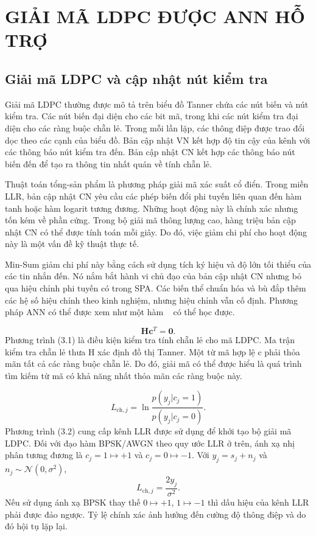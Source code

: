 \chapter[\textbf{GIẢI MÃ LDPC ĐƯỢC ANN HỖ TRỢ}]{GIẢI MÃ LDPC ĐƯỢC ANN HỖ TRỢ}
\section{Giải mã LDPC và cập nhật nút kiểm tra}
Giải mã LDPC thường được mô tả trên biểu đồ Tanner chứa các nút biến và nút kiểm tra. Các nút biến đại diện cho các bit mã, trong khi các nút kiểm tra đại diện cho các ràng buộc chẵn lẻ. Trong mỗi lần lặp, các thông điệp được trao đổi dọc theo các cạnh của biểu đồ. Bản cập nhật VN kết hợp độ tin cậy của kênh với các thông báo nút kiểm tra đến. Bản cập nhật CN kết hợp các thông báo nút biến đến để tạo ra thông tin nhất quán về tính chẵn lẻ.

Thuật toán tổng-sản phẩm là phương pháp giải mã xác suất cổ điển. Trong miền LLR, bản cập nhật CN yêu cầu các phép biến đổi phi tuyến liên quan đến hàm tanh hoặc hàm logarit tương đương. Những hoạt động này là chính xác nhưng tốn kém về phần cứng. Trong bộ giải mã thông lượng cao, hàng triệu bản cập nhật CN có thể được tính toán mỗi giây. Do đó, việc giảm chi phí cho hoạt động này là một vấn đề kỹ thuật thực tế.

Min-Sum giảm chi phí này bằng cách sử dụng tích ký hiệu và độ lớn tối thiểu của các tin nhắn đến. Nó nắm bắt hành vi chủ đạo của bản cập nhật CN nhưng bỏ qua hiệu chỉnh phi tuyến có trong SPA. Các biến thể chuẩn hóa và bù đắp thêm các hệ số hiệu chỉnh theo kinh nghiệm, nhưng hiệu chỉnh vẫn cố định. Phương pháp ANN có thể được xem như một hàm ~ có thể học được.

\begin{equation}
\mathbf{H}\mathbf{c}^{T}=\mathbf{0}.
\end{equation}
Phương trình (3.1) là điều kiện kiểm tra tính chẵn lẻ cho mã LDPC. Ma trận kiểm tra chẵn lẻ thưa H xác định đồ thị Tanner. Một từ mã hợp lệ c phải thỏa mãn tất cả các ràng buộc chẵn lẻ. Do đó, giải mã có thể được hiểu là quá trình tìm kiếm từ mã có khả năng nhất thỏa mãn các ràng buộc này.

\begin{equation}
L_{\mathrm{ch},j}=\ln\frac{p(y_j|c_j=1)}{p(y_j|c_j=0)}.
\end{equation}
Phương trình (3.2) cung cấp kênh LLR được sử dụng để khởi tạo bộ giải mã LDPC. Đối với đạo hàm BPSK/AWGN theo quy ước LLR ở trên, ánh xạ nhị phân tương đương là $c_j=1\mapsto +1$ và $c_j=0\mapsto -1$. Với $y_j=s_j+n_j$ và $n_j\sim\mathcal{N}(0,\sigma^2)$,
\begin{equation*}
L_{\mathrm{ch},j}=\frac{2y_j}{\sigma^2}.
\end{equation*}
Nếu sử dụng ánh xạ BPSK thay thế $0\mapsto +1$, $1\mapsto -1$ thì dấu hiệu của kênh LLR phải được đảo ngược. Tỷ lệ chính xác ảnh hưởng đến cường độ thông điệp và do đó hội tụ lặp lại.

